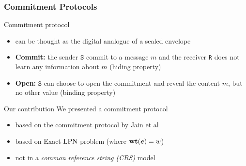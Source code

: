 \begin{frame}
\frametitle{Commitment Protocols}
\begin{block}{Commitment protocol}
 \begin{itemize}
  \item can be thought as the digital analogue of a sealed envelope
  \item \textbf{Commit: } the sender $\mathtt{S}$ commit to a message $m$ and the receiver $\mathtt{R}$ does not learn any information about $m$ (\alert{hiding} property)
  \item \textbf{Open: } $\mathtt{S}$ can choose to open the commitment and reveal the content $m$, but no other value (\alert{binding} property)
 \end{itemize}
\end{block}


\begin{block}{Our contribution}
 We presented a commitment protocol
 \begin{itemize}
  \item based on the commitment protocol by Jain et al
  \item based on Exact-$\mathrm{LPN}$ problem (where $\mathbf{wt}(\boldsymbol{e})=w$)
  \item not in a \emph{common reference string (CRS)} model
 \end{itemize}
\end{block}


\end{frame}



